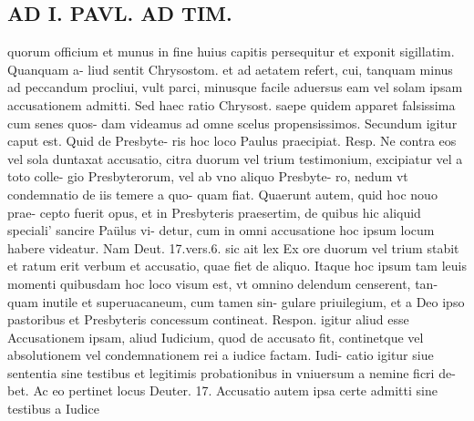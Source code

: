 \documentclass{article}
\begin{document}
\begin{pages}
\section*{AD I. PAVL. AD TIM. }
\marginpar{[ p.51 ]}\pstart quorum officium et munus in fine huius capitis persequitur et exponit sigillatim. Quanquam a- liud sentit Chrysostom. et ad aetatem refert, cui, tanquam minus ad peccandum procliui, vult parci, minusque facile aduersus eam vel solam ipsam accusationem admitti. Sed haec ratio Chrysost. saepe quidem apparet falsissima cum senes quos- dam videamus ad omne scelus propensissimos. Secundum igitur caput est. Quid de Presbyte- ris hoc loco Paulus praecipiat. Resp. Ne contra eos vel sola duntaxat accusatio, citra duorum vel trium testimonium, excipiatur vel a toto colle- gio Presbyterorum, vel ab vno aliquo Presbyte- ro, nedum vt condemnatio de iis temere a quo- quam fiat. Quaerunt autem, quid hoc nouo prae- cepto fuerit opus, et in Presbyteris praesertim, de quibus hic aliquid speciali' sancire Paülus vi- detur, cum in omni accusatione hoc ipsum locum habere videatur. Nam Deut. 17.vers.6. sic ait lex Ex ore duorum vel trium stabit et ratum erit verbum et accusatio, quae fiet de aliquo. Itaque hoc ipsum tam leuis momenti quibusdam hoc loco visum est, vt omnino delendum censerent, tan- quam inutile et superuacaneum, cum tamen sin- gulare priuilegium, et a Deo ipso pastoribus et Presbyteris concessum contineat. Respon. igitur aliud esse Accusationem ipsam, aliud Iudicium, quod de accusato fit, continetque vel absolutionem vel condemnationem rei a iudice factam. Iudi- catio igitur siue sententia sine testibus et legitimis probationibus in vniuersum a nemine ficri de- bet. Ac eo pertinet locus Deuter. 17. Accusatio autem ipsa certe admitti sine testibus a Iudice  \pend

\end{pages}
\end{document}
